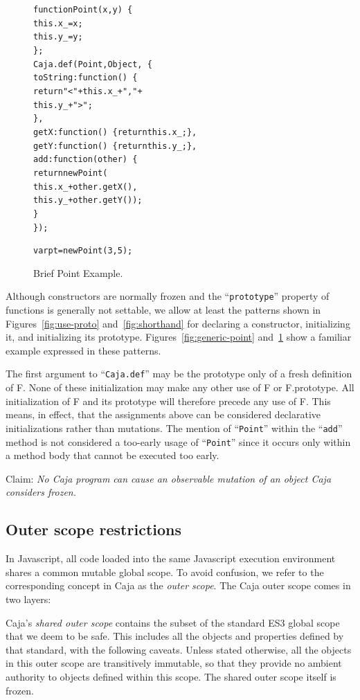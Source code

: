 \documentclass[letterpaper,twocolumn,10pt]{article}
\newcommand{\code}[1]{{\tt {#1}}}              %
\begin{document}
\begin{figure}
\begin{alltt}
function Point(x, y)\ \{
  this.x\_ = x;
  this.y\_ = y;
\};
Caja.def(Point, Object,\ \{
  toString: function()\ \{ 
    return "<" + this.x\_ + "," + 
                 this.y\_ + ">"; 
  \},
  getX: function()\ \{ return this.x\_; \},
  getY: function()\ \{ return this.y\_; \},
  add: function(other)\ \{
    return new Point(
      this.x\_ + other.getX(),
      this.y\_ + other.getY());
  \}
\});

var pt = new Point(3, 5);
\end{alltt}

\caption[Brief Point Example.]{Brief Point Example.}
\label{fig:brief-point}
\end{figure}

Although constructors are normally frozen and the ``\code{prototype}'' 
property of functions is generally not settable, we allow at least the 
patterns shown in Figures~\ref{fig:use-proto} and~\ref{fig:shorthand} for 
declaring a constructor, initializing it, and initializing its prototype. 
Figures~\ref{fig:generic-point} and~\ref{fig:brief-point} show a familiar 
example expressed in these patterns.

The first argument to ``\code{Caja.def}'' may be the prototype only of a 
fresh definition of F. None of these initialization may make any other use of 
F or F.prototype. All initialization of F and its prototype will therefore 
precede any use of F. This means, in effect, that the assignments above can 
be considered declarative initializations rather than mutations. The mention 
of ``\code{Point}'' within the ``\code{add}'' method is not considered a 
too-early usage of ``\code{Point}'' since it occurs only within a method body 
that cannot be executed too early.

Claim: \emph{No Caja program can cause an observable mutation of an object
Caja considers frozen.}


\subsection{Outer scope restrictions}

In Javascript, all code loaded into the same Javascript execution environment 
shares a common mutable global scope. To avoid confusion, we refer to the 
corresponding concept in Caja as the \emph{outer scope}. The Caja outer scope
 comes in two layers:

Caja's \emph{shared outer scope} contains the subset of the standard ES3 
global scope that we deem to be safe. This includes all the objects and 
properties defined by that standard, with the following caveats. Unless 
stated otherwise, all the objects in this outer scope are transitively 
immutable, so that they provide no ambient authority to objects defined 
within this scope. The shared outer scope itself is frozen.
\end{document}
